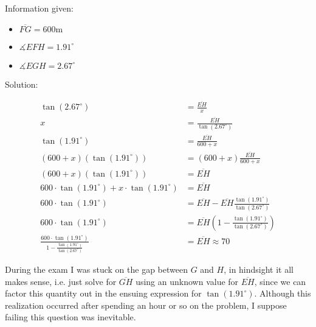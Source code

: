 \newpage
\begin{figure}[!h]
\centering
{}
\end{figure}

Information given:

\begin{itemize}
    \item $\overline{FG} = 600  {\displaystyle {\text{m}}}$
    \item $\measuredangle EFH = 1.91^\circ$
    \item $\measuredangle EGH = 2.67^\circ$
\end{itemize}

Solution:

\begin{equation}
\begin{split}
\tan(2.67^\circ) &= \frac{\overline{EH}}{x} \\
x &= \frac{\overline{EH}}{\tan(2.67^\circ)} \\
\tan(1.91^\circ) &= \frac{\overline{EH}}{600 + x} \\
(600 + x)(\tan(1.91^\circ)) &= (600 + x)\frac{\overline{EH}}{600 + x} \\
(600 + x)(\tan(1.91^\circ)) &= \overline{EH} \\
600 \cdot \tan(1.91^\circ) + x \cdot \tan(1.91^\circ) &= \overline{EH} \\
600 \cdot \tan(1.91^\circ) &= \overline{EH} - \overline{EH} \frac{\tan(1.91^\circ)}{\tan(2.67^\circ)} \\
600 \cdot \tan(1.91^\circ) &= \overline{EH}(1 - \frac{\tan(1.91^\circ)}{\tan(2.67^\circ)}) \\
\frac{600 \cdot \tan(1.91^\circ)}{1 - \frac{\tan(1.91^\circ)}{\tan(2.67^\circ)}} &= \overline{EH} \approx 70
\end{split}
\end{equation}

\newpage

During the exam I was stuck on the gap between $G$ and $H$, in hindsight it all makes sense, i.e. just solve for $\overline{GH}$ using an unknown value for $\overline{EH}$, since we can factor this quantity out in the ensuing expression for $\tan(1.91^\circ)$. Although this realization occurred after spending an hour or so on the problem, I suppose failing this question was inevitable.

